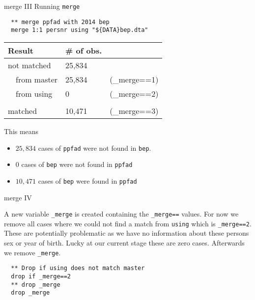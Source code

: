 \begin{frame}[fragile]{merge III}
Running \texttt{merge} 

\begin{lstlisting}
  ** merge ppfad with 2014 bep
  merge 1:1 persnr using "${DATA}bep.dta"
\end{lstlisting}

\begin{table}
\begin{center}
\begin{scriptsize}
\begin{tabular}{lll}
 Result & \# of obs. & \\ 
 \midrule
 not matched & 25,834 & \\
 ~~from master & 25,834  &(\_merge==1) \\
 ~~from using  & 0 &(\_merge==2) \\
 & & \\
 matched & 10,471 & (\_merge==3) \\
 \midrule
\end{tabular}
\end{scriptsize}
\end{center}
\end{table}
This means 
\begin{itemize}
 \item $25,834$ cases of \texttt{ppfad} were not found in \texttt{bep}.
 \item $0$ cases of \texttt{bep} were not found in \texttt{ppfad}
 \item $10,471$ cases of \texttt{bep} were found in \texttt{ppfad}
\end{itemize}
\end{frame}

\begin{frame}[fragile]{merge IV}
\begin{minipage}{11cm}
A new variable \texttt{\_merge} is created containing the \texttt{\_merge==} values. For now we remove all cases where we could not find a match from \texttt{using} which is \texttt{\_merge==2}. These are potentially problematic as we have no information about these persons sex or year of birth. Lucky at our current stage these are zero cases. Afterwards we remove \texttt{\_merge}.
\begin{lstlisting}
  ** Drop if using does not match master
  drop if _merge==2
  ** drop _merge
  drop _merge
\end{lstlisting}
\end{minipage}



\end{frame}

